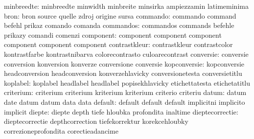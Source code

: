                minbreedte: minbreedte                minwidth
                           minbreite                 minsirka
                           ampiezzamin               latimeminima %
                     bron: bron                      source
                           quelle                    zdroj
                           origine                   sursa
                 commando: commando                  command
                           befehl                    prikaz
                           comando                   comanda
                commandos: commandos                 commands
                           befehle                   prikazy
                           comandi                   comenzi
component: component                 component
           component                 component
           component                 component
            contrastkleur: contrastkleur             contrastcolor
                           kontrastfarbe             kontrastnibarva
                           colorecontrasto           culoarecontrast
                conversie: conversie                 conversion
                           konversion                konverze
                           conversione               conversie
             kopconversie: kopconversie              headconversion
                           headconversion            konverzehlavicky
                           conversionetesta          conversietitlu %
                 koplabel: koplabel                  headlabel
                           headlabel                 popisekhlavicky
                           etichettatesta            etichetatitlu %
                criterium: criterium                 criterium
                           kriterium                 kriterium
                           criterio                  criteriu
                    datum: datum                     date
                           datum                     datum
                           data                      data
                  default: default                   default
                           default                   implicitni
                           implicito                 implicit
                   diepte: diepte                    depth
                           tiefe                     hloubka
                           profondita                inaltime
          dieptecorrectie: dieptecorrectie           depthcorrection
                           tiefekorrektur            korekcehloubky
                           correzioneprofondita      corectieadancime
